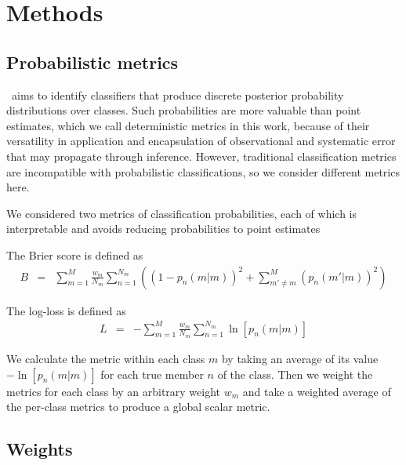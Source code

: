 \section{Methods}
\label{sec:methods}

\subsection{Probabilistic metrics}
\label{sec:metrics}

\plasticc\ aims to identify classifiers that produce discrete posterior probability distributions over classes.
Such probabilities are more valuable than point estimates, which we call deterministic metrics in this work, because of their versatility in application and encapsulation of observational and systematic error that may propagate through inference.
However, traditional classification metrics are incompatible with probabilistic classifications, so we consider different metrics here.


We considered two metrics of classification probabilities, each of which is interpretable and avoids reducing probabilities to point estimates

The Brier score is defined as
\begin{eqnarray}
B &=& \sum_{m=1}^{M}\frac{w_{m}}{N_{m}}\sum_{n=1}^{N_{m}}\left((1-p_{n}(m | m))^{2}+\sum_{m'\neq m}^{M}(p_{n}(m' | m))^{2}\right)
\end{eqnarray}

The log-loss is defined as
\begin{eqnarray}
L &=& -\sum_{m=1}^{M}\frac{w_{m}}{N_{m}}\sum_{n=1}^{N_{m}}\ln[p_{n}(m | m)]
\end{eqnarray}


We calculate the metric within each class $m$ by taking an average of its value $-\ln[p_{n}(m | m)]$ for each true member $n$ of the class.  Then we weight the metrics for each class by an arbitrary weight $w_{m}$ and take a weighted average of the per-class metrics to produce a global scalar metric.

\subsection{Weights}
\label{sec:weights}

